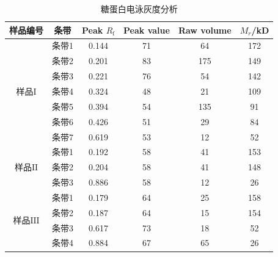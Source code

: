 \begin{table}[]
\centering
\caption{糖蛋白电泳灰度分析}
\label{tab:}
\begin{tabular}{@{}cccccc@{}}
\toprule
样品编号                                               & 条带  & Peak $R_\text{f}$ & Peak value & Raw volume & $M_r$/kD \\ \midrule
\multirow{7}{*}{样品$\mathrm{I}$}                               & 条带1 & 0.144   & 71         & 64         & 172   \\
                                                   & 条带2 & 0.201   & 83         & 175        & 149   \\
                                                   & 条带3 & 0.221   & 76         & 54         & 142   \\
                                                   & 条带4 & 0.324   & 48         & 21         & 109   \\
                                                   & 条带5 & 0.394   & 54         & 135        & 91    \\
                                                   & 条带6 & 0.426   & 51         & 29         & 84    \\
                                                   & 条带7 & 0.619   & 53         & 12         & 52    \\ \midrule
\multirow{3}{*}{样品$\mathrm{II}$}                               & 条带1 & 0.192   & 58         & 41         & 153   \\
                                                   & 条带2 & 0.204   & 58         & 41         & 148   \\
                                                   & 条带3 & 0.886   & 58         & 12         & 26    \\ \midrule
\multirow{4}{*}{样品$\mathrm{III}$}                               & 条带1 & 0.179   & 64         & 25         & 158   \\
                                                   & 条带2 & 0.187   & 64         & 15         & 154   \\
                                                   & 条带3 & 0.617   & 73         & 18         & 52    \\
                                                   & 条带4 & 0.884   & 67         & 65         & 26    \\ \midrule

\end{tabular}
\end{table}
